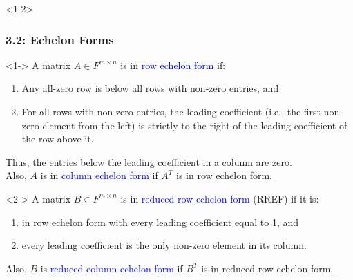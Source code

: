 \documentclass[10pt,english,aspectratio=169]{beamer}
\begin{document}

\begin{frame}<1-2> \frametitle{3.2: Echelon Forms}

\begin{definition}<1->
A matrix $A \in F^{m\times n}$ is in \textcolor{blue}{row echelon form} if:
\begin{enumerate}
\item Any all-zero row is below all rows with non-zero entries, and
\item For all rows with non-zero entries, the leading coefficient (i.e., the first non-zero element from the left) is strictly to the right of the leading coefficient of the row above it.
\end{enumerate}
Thus, the entries below the leading coefficient in a column are zero. \\
Also, $A$ is in \textcolor{blue}{column echelon form} if $A^T$ is in row echelon form.
\end{definition}

\begin{definition}<2->
A matrix $B \in F^{m\times n}$ is in \textcolor{blue}{reduced row echelon form} (RREF) if it is:
\begin{enumerate}
\item in row echelon form with every leading coefficient equal to 1, and
\item every leading coefficient is the only non-zero element in its column.
\end{enumerate}
Also, $B$ is \textcolor{blue}{reduced column echelon form} if $B^T$ is in reduced row echelon form.
\end{definition}





\end{frame}
\end{document}

